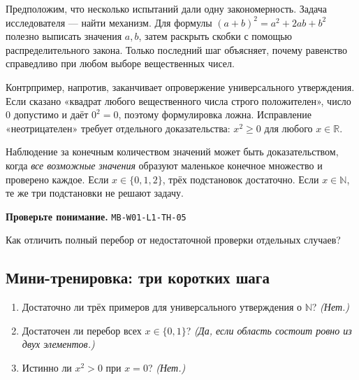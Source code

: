 \documentclass[11pt,a4paper,openany]{book}
\newcommand{\muid}[1]{\texttt{\footnotesize #1}}
\begin{document}
Предположим, что несколько испытаний дали одну закономерность. Задача исследователя — найти механизм. Для формулы $(a+b)^2=a^2+2ab+b^2$ полезно выписать значения $a,b$, затем раскрыть скобки с помощью распределительного закона. Только последний шаг объясняет, почему равенство справедливо при любом выборе вещественных чисел.


Контрпример, напротив, заканчивает опровержение универсального утверждения. Если сказано «квадрат любого вещественного числа строго положителен», число $0$ допустимо и даёт $0^2=0$, поэтому формулировка ложна. Исправление «неотрицателен» требует отдельного доказательства: $x^2\ge0$ для любого $x\in\mathbb R$.


Наблюдение за конечным количеством значений может быть доказательством, когда \emph{все возможные значения} образуют маленькое конечное множество и проверено каждое. Если $x\in\{0,1,2\}$, трёх подстановок достаточно. Если $x\in\mathbb N$, те же три подстановки не решают задачу.


\begin{center}
\end{center}

\begin{learnbox}\textbf{Проверьте понимание.} \muid{MB-W01-L1-TH-05}\par Как отличить полный перебор от недостаточной проверки отдельных случаев?\end{learnbox}

\subsection*{Мини-тренировка: три коротких шага}
\begin{enumerate}[label=\arabic*),leftmargin=*,itemsep=3pt]

\item Достаточно ли трёх примеров для универсального утверждения о $\mathbb N$? \textit{(Нет.)}

\item Достаточен ли перебор всех $x\in\{0,1\}$? \textit{(Да, если область состоит ровно из двух элементов.)}

\item Истинно ли $x^2>0$ при $x=0$? \textit{(Нет.)}

\end{enumerate}
\end{document}
